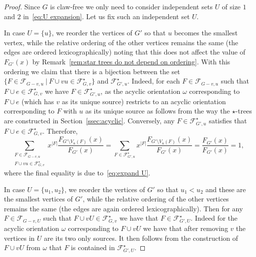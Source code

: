 \documentclass[a4paper,11pt,reqno]{amsart}
\numberwithin{equation}{section}
\begin{document}
\begin{proof}
Since $G$ is claw-free we only need to consider independent sets $U$ of size $1$ and $2$ in~\eqref{eq:U expansion}.
Let us fix such an independent set $U$.

In case $U=\{u\}$, we reorder the vertices of $G'$ so that $u$ becomes the smallest vertex, while the relative ordering of the other vertices remains the same (the edges are ordered lexicographically) noting that this does not affect the value of $F_{G'}(x)$ by Remark~\ref{rem:star trees do not depend on ordering}.
With this ordering we claim that there is a bijection between the set $\{F\in \mathcal{F}_{G-v,u} ~|~F\cup vu \in \mathcal{F}^\star_{G,v}\}$ and $\mathcal{F}^\star_{G',u}$. 
Indeed, for each $F\in \mathcal{F}_{G-v,u}$ such that $F\cup e\in \mathcal{F}^\star_{G,v}$ we have  $F\in \mathcal{F}^\star_{G',u}$, as the acyclic orientation $\omega$ corresponding to $F\cup e$ (which has $v$ as its unique source) restricts to an acyclic orientation corresponding to $F$ with $u$ as its unique source as follows from the way the $\star$-trees are constructed in Section~\ref{ssec:acyclic}.
Conversely, any $F\in \mathcal{F}^\star_{G',u}$ satisfies that $F\cup e\in \mathcal{F}^\star_{G,v}$.
Therefore, 
\[
\sum_{\substack{F\in \mathcal{F}_{G-v,u}\\F\cup vu \in \mathcal{F}^\star_{G,v}}}x^{|F|} \frac{F_{G'\setminus V_u(F)}(x)}{F_{G'}(x)}=\sum_{F\in \mathcal{F}^\star_{G',u}}x^{|F|} \frac{F_{G'\setminus V_u(F)}(x)}{F_{G'}(x)}=\frac{F_{G'}(x)}{F_{G'}(x)}=1,
\]
where the final equality is due to~\eqref{eq:expand U}.

In case $U=\{u_1,u_2\}$, we reorder the vertices of $G'$ so that $u_1<u_2$ and these are the smallest vertices of $G'$, while the relative ordering of the other vertices remains the same (the edges are again ordered lexicographically). Then for any $F\in \mathcal{F}_{G-v,U}$ such that $F\cup vU\in \mathcal{F}^\star_{G,v}$ we have that $F\in \mathcal{F}^\star_{G',U}$. Indeed for the acyclic orientation $\omega$ corresponding to $F\cup vU$ we have that after removing $v$ the vertices in $U$ are its two only sources. 
It then follows from the construction of $F\cup vU$ from $\omega$ that $F$ is contained in $\mathcal{F}^\star_{G',U}$.    


\end{proof}
\end{document}
